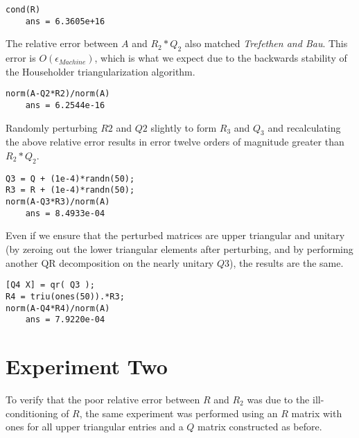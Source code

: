 \documentclass{article}
\begin{document}
\begin{framed}
\begin{verbatim}
cond(R)
    ans = 6.3605e+16
\end{verbatim}
\end{framed}

The relative error between \(A\) and \(R_2*Q_2\) also matched \emph{Trefethen and Bau}. This error is \( O\left(\epsilon_{Machine}\right) \), which is what we expect due to the backwards stability of the Householder triangularization algorithm.

\begin{framed}
\begin{verbatim}
norm(A-Q2*R2)/norm(A)
    ans = 6.2544e-16
\end{verbatim}
\end{framed}

Randomly perturbing \(R2\) and \(Q2\) slightly to form \(R_3\) and \(Q_3\) and recalculating the above relative error results in error twelve orders of magnitude greater than \(R_2*Q_2\).

\begin{framed}
\begin{verbatim}
Q3 = Q + (1e-4)*randn(50);
R3 = R + (1e-4)*randn(50);
norm(A-Q3*R3)/norm(A)
    ans = 8.4933e-04
\end{verbatim}
\end{framed}

Even if we ensure that the perturbed matrices are upper triangular and unitary (by zeroing out the lower triangular elements after perturbing, and by performing another QR decomposition on the nearly unitary \(Q3\)), the results are the same.

\begin{framed}
\begin{verbatim}
[Q4 X] = qr( Q3 );
R4 = triu(ones(50)).*R3; 
norm(A-Q4*R4)/norm(A)
    ans = 7.9220e-04
\end{verbatim}
\end{framed}

\section{Experiment Two}\label{m2}

To verify that the poor relative error between \(R\) and \(R_2\) was due to the ill-conditioning of \(R\), the same experiment was performed using an \(R\) matrix with ones for all upper triangular entries and a \(Q\) matrix constructed as before.
\end{document}
